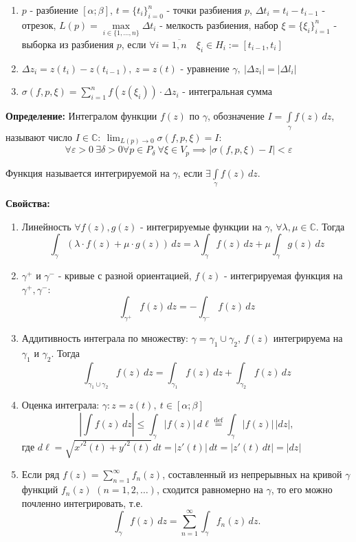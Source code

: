 \begin{enumerate}
\def\labelenumi{\arabic{enumi}.}
\tightlist
\item
  \(p\) - разбиение \([\alpha;\beta]\), \(t=\{ t_{i} \}_{i=0}^{n}\) -
  точки разбиения \(p\), \(\Delta t_{i}=t_{i}-t_{i-1}\) - отрезок,
  \(L(p)=\max\limits_{i\in \{ 1,\dots,n \}}\Delta t_{i}\) - мелкость
  разбиения, набор \(\xi=\{ \xi_{i} \}_{i=1}^{n}\) - выборка из
  разбиения \(p\), если
  \(\forall i=\overline{1,n}\quad \xi_{i}\in H_{i}:=[t_{i-1},t_{i}]\)
\item
  \(\Delta z_{i}=z(t_{i})- z(t_{i-1}), \ z=z(t)\) - уравнение
  \(\gamma, \ |\Delta z_{i}|=|\Delta l_{i}|\)
\item
  \(\sigma(f,p,\xi)=\sum\limits_{i=1}^{n}f(z(\xi_{i}))\cdot\Delta z_{i}\)
  - интегральная сумма
\end{enumerate}

\textbf{Определение:} Интегралом функции \(f(z)\) по \(\gamma\),
обозначение \(I=\int\limits_{\gamma}f(z)\,dz\), называют число
\(I\in \mathbb{C}: \ \lim_{ L(p) \to 0}\sigma(f,p,\xi)=I\): \[
\forall\varepsilon>0 \ \exists\delta>0 \forall p \in P_{\delta} \ \forall \xi \in V_{p}\implies |\sigma(f,p,\xi)-I|<\varepsilon
\]

Функция называется интегрируемой на \(\gamma\), если
\(\exists \int\limits_{\gamma}f(z)\,dz\).

\textbf{Свойства:}

\begin{enumerate}
\def\labelenumi{\arabic{enumi}.}
\tightlist
\item
  Линейность \(\forall f(z), g(z)\) - интегрируемые функции на
  \(\gamma\), \(\forall\lambda,\mu \in \mathbb{C}\). Тогда \[
  \int_{\gamma}(\lambda\cdot f(z)+\mu\cdot g(z))\,dz=\lambda \int_{\gamma}f(z)\,dz+\mu \int_{\gamma}g(z)\,dz
  \]
\item
  \(\gamma^{+}\) и \(\gamma^{-}\) - кривые с разной ориентацией,
  \(f(z)\) - интегрируемая функция на \(\gamma^{+}, \gamma^{-}\): \[
  \int_{\gamma^{+}}f(z)\,dz=-\int_{\gamma^{-}}f(z)\,dz
  \]
\item
  Аддитивность интеграла по множеству:
  \(\gamma=\gamma_{1}\cup\gamma_{2}, \ f(z)\) интегрируема на
  \(\gamma_{1}\) и \(\gamma_{2}\). Тогда \[
  \int_{\gamma_{1}\cup\gamma_{2}}f(z)\,dz=\int_{\gamma_{1}}f(z)\,dz+\int_{\gamma_{2}}f(z)\,dz
  \]
\item
  Оценка интеграла: \(\gamma:z=z(t), \ t\in[\alpha;\beta]\) \[
  \left\lvert \int f(z)\,dz   \right\rvert \leq \int_{\gamma} |f(z)|\,d\ell \overset{\mathrm{def}}{=}\int_{\gamma}|f(z)|\,|dz|,
  \] где
  \(d \ell=\sqrt{ x'^{2}(t)+y'^{2}(t) }\,dt=|z'(t)|\,dt=|z'(t)\,dt|=|dz|\)
\item
  Если ряд \(f(z)=\sum\limits_{n=1}^{\infty}f_{n}(z)\), составленный из
  непрерывных на кривой \(\gamma\) функций \(f_{n}(z)\)
  \((n=1,2,\dots)\), сходится равномерно на \(\gamma\), то его можно
  почленно интегрировать, т.е. \[
  \int_{\gamma}f(z)\,dz=\sum_{n=1}^{\infty}\int_{\gamma}f_{n}(z)\,dz.
  \]
\end{enumerate}
